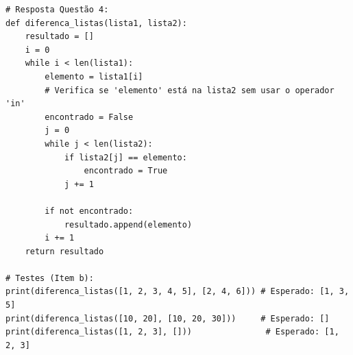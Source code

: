 \ifmostrarGabarito
\begin{verbatim}
# Resposta Questão 4:
def diferenca_listas(lista1, lista2):
    resultado = []
    i = 0
    while i < len(lista1):
        elemento = lista1[i]
        # Verifica se 'elemento' está na lista2 sem usar o operador 'in'
        encontrado = False
        j = 0
        while j < len(lista2):
            if lista2[j] == elemento:
                encontrado = True
            j += 1
        
        if not encontrado:
            resultado.append(elemento)
        i += 1
    return resultado

# Testes (Item b):
print(diferenca_listas([1, 2, 3, 4, 5], [2, 4, 6])) # Esperado: [1, 3, 5]
print(diferenca_listas([10, 20], [10, 20, 30]))     # Esperado: []
print(diferenca_listas([1, 2, 3], []))               # Esperado: [1, 2, 3]
\end{verbatim}
\fi
